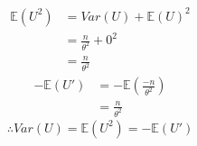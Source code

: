 \documentclass[a4paper]{article}
\begin{document}
		\begin{equation*}
			\begin{split}
				\mathbb{E}(U^2) &= Var(U) + \mathbb{E}(U)^2\\
				&= \frac{n}{\theta^2} + 0^2\\
				&= \frac{n}{\theta^2}
			\end{split}
		\end{equation*}
		\begin{equation*}
			\begin{split}
				-\mathbb{E}(U') &= -\mathbb{E}(\frac{-n}{\theta^2})\\
				&= \frac{n}{\theta^2}
			\end{split}
		\end{equation*}
		\[\therefore Var(U) = \mathbb{E}(U^2) = -\mathbb{E}(U')\]
\end{document}
